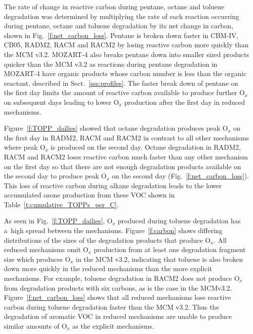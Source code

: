 \documentclass[acpd, online, hvmath]{copernicus}
\providecommand{\DIFadd}[1]{{\protect\color{blue}\uwave{#1}}} %
\providecommand{\DIFaddbegin}{} %
\providecommand{\DIFaddend}{} %
\begin{document}
The rate of change in reactive carbon during pentane, octane and
toluene degradation was determined by multiplying the rate of each
reaction occurring during pentane, octane and toluene degradation by
its net change in carbon, shown in Fig.~\ref{f:net_carbon_loss}.
Pentane is broken down faster in CBM-IV, CB05, RADM2, RACM and RACM2
by losing reactive carbon more quickly than the MCM v3.2.  MOZART-4
also breaks pentane down into smaller sized products quicker than the
MCM v3.2 as reactions during pentane degradation in MOZART-4 have
organic products whose carbon number is less than the organic
reactant, described in Sect.~\ref{sss:profiles}.  The faster break
down of pentane on the first day limits the amount of reactive carbon
available to produce further O$_{x}$ on subsequent days leading to
lower O$_{x}$ production after the first day in reduced mechanisms.

Figure~\ref{f:TOPP_dailies} showed that octane degradation produces
peak O$_{x}$ on the first day in RADM2, RACM and RACM2 in contrast
to all other mechanisms where peak O$_{x}$ is produced on the
second day.  Octane degradation in RADM2, RACM and RACM2 loses
reactive carbon much faster than any other mechanism on the first day
so that there are not enough degradation products available on the
second day to produce peak O$_{x}$ on the second day
(Fig.~\ref{f:net_carbon_loss}).  This loss of reactive carbon during
alkane degradation leads to the lower accumulated ozone production
from these VOC shown in Table~\ref{t:cumulative_TOPPs_per_C}.

As seen in Fig.~\ref{f:TOPP_dailies}, O$_{x}$ produced during
toluene degradation has a~high spread between the mechanisms.
Figure~\ref{f:carbon} shows differing distributions of the sizes of
the degradation products that produce O$_{x}$.  All reduced
mechanisms omit O$_{x}$ production from at least one degradation
fragment size which produces O$_{x}$ in the MCM v3.2, indicating
that toluene is also broken down more quickly in the reduced
mechanisms than the more explicit mechanisms.  For example, toluene
degradation in RACM2 does not produce O$_{x}$ from degradation
products with six carbons, as is the case in the MCM\DIFaddbegin \DIFadd{~}\DIFaddend v3.2.
Figure~\ref{f:net_carbon_loss} shows that all reduced mechanisms lose
reactive carbon during toluene degradation faster than the MCM v3.2.
Thus the degradation of aromatic VOC in reduced mechanisms are unable
to produce similar amounts of O$_{x}$ as the explicit mechanisms.
\end{document}

